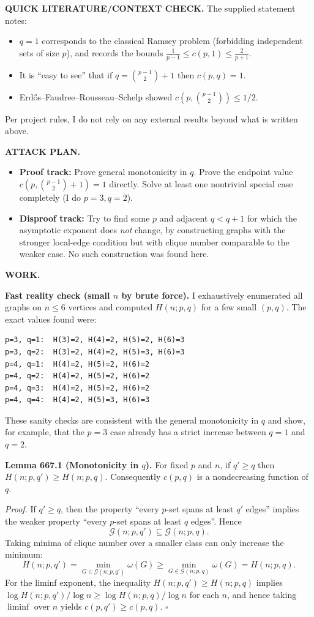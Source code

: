 \bigskip
\noindent\textbf{QUICK LITERATURE/CONTEXT CHECK.}
The supplied statement notes:
\begin{itemize}
\item $q=1$ corresponds to the classical Ramsey problem (forbidding independent sets of size $p$), and records the bounds $\frac1{p-1}\le c(p,1)\le \frac{2}{p+1}$.
\item It is ``easy to see'' that if $q=\binom{p-1}{2}+1$ then $c(p,q)=1$.
\item Erd\H{o}s--Faudree--Rousseau--Schelp showed $c(p,\binom{p-1}{2})\le 1/2$.
\end{itemize}
Per project rules, I do not rely on any external results beyond what is written above.

\bigskip
\noindent\textbf{ATTACK PLAN.}
\begin{itemize}
\item \textbf{Proof track:} Prove general monotonicity in $q$. Prove the endpoint value $c(p,\binom{p-1}{2}+1)=1$ directly. Solve at least one nontrivial special case completely (I do $p=3,q=2$).
\item \textbf{Disproof track:} Try to find some $p$ and adjacent $q<q+1$ for which the asymptotic exponent does \emph{not} change, by constructing graphs with the stronger local-edge condition but with clique number comparable to the weaker case. No such construction was found here.
\end{itemize}

\bigskip
\noindent\textbf{WORK.}

\medskip
\noindent\textbf{Fast reality check (small $n$ by brute force).}
I exhaustively enumerated all graphs on $n\le 6$ vertices and computed $H(n;p,q)$ for a few small $(p,q)$.
The exact values found were:
\begin{verbatim}
p=3, q=1:  H(3)=2, H(4)=2, H(5)=2, H(6)=3
p=3, q=2:  H(3)=2, H(4)=2, H(5)=3, H(6)=3
p=4, q=1:  H(4)=2, H(5)=2, H(6)=2
p=4, q=2:  H(4)=2, H(5)=2, H(6)=2
p=4, q=3:  H(4)=2, H(5)=2, H(6)=2
p=4, q=4:  H(4)=2, H(5)=3, H(6)=3
\end{verbatim}
These sanity checks are consistent with the general monotonicity in $q$ and show, for example, that the $p=3$ case already has a strict increase between $q=1$ and $q=2$.

\medskip
\noindent\textbf{Lemma 667.1 (Monotonicity in $q$).}
For fixed $p$ and $n$, if $q'\ge q$ then $H(n;p,q')\ge H(n;p,q)$.
Consequently $c(p,q)$ is a nondecreasing function of $q$.

\noindent\emph{Proof.}
If $q'\ge q$, then the property ``every $p$-set spans at least $q'$ edges'' implies the weaker property ``every $p$-set spans at least $q$ edges''. Hence
\[\mathcal{G}(n;p,q')\subseteq \mathcal{G}(n;p,q).\]
Taking minima of clique number over a smaller class can only increase the minimum:
\[
H(n;p,q') 
= \min_{G\in\mathcal{G}(n;p,q')} \omega(G)
\ge \min_{G\in\mathcal{G}(n;p,q)} \omega(G)
= H(n;p,q).
\]
For the liminf exponent, the inequality $H(n;p,q')\ge H(n;p,q)$ implies
\(\log H(n;p,q')/\log n\ge \log H(n;p,q)/\log n\) for each $n$, and hence taking $\liminf$ over $n$ yields $c(p,q')\ge c(p,q)$.
\hfill$\square$

